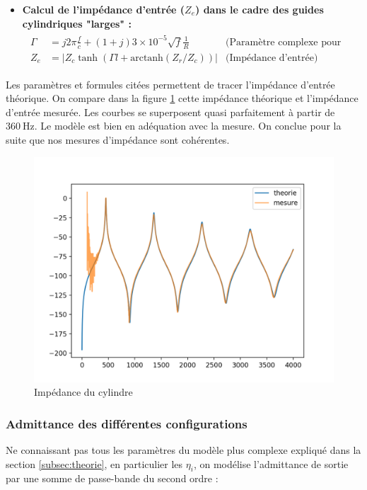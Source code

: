 \documentclass[atiam, article]{rapport} %
\begin{document}
\begin{itemize}
    \item \textbf{Calcul de l'impédance d'entrée (\(Z_e\)) dans le cadre des guides cylindriques "larges" :}
    \begin{align*}
        \begin{array}{lll}
            \Gamma & = j2\pi\frac{f}{c} + (1 + j)3 \times 10^{-5} \sqrt{f} \frac{1}{R} & \text{(Paramètre complexe pour les pertes viscothermiques)} \\
            Z_e & = \lvert Z_c \tanh(\Gamma l + \text{arctanh}(Z_r/Z_c)) \rvert & \text{(Impédance d'entrée)}
        \end{array}
        \label{eq:ze-cyl}
    \end{align*}
\end{itemize}

Les paramètres et formules citées permettent de tracer l'impédance d'entrée théorique. On compare dans la figure \ref{fig:ze-cyl} cette impédance théorique et l'impédance d'entrée mesurée. Les courbes se superposent quasi parfaitement à partir de $\SI{360}{\Hz}$. Le modèle est bien en adéquation avec la mesure. On conclue pour la suite que nos mesures d'impédance sont cohérentes.

\begin{figure}
    \centering
    \includegraphics[width=.7\textwidth]{vents/images_vents/impedance_cylindre.png}
    \caption{Impédance du cylindre}
    \label{fig:ze-cyl}
\end{figure}

\subsubsection{Admittance des différentes configurations}

Ne connaissant pas tous les paramètres du modèle plus complexe expliqué dans la section \ref{subsec:theorie}, en particulier les $\eta_i$, on modélise l'admittance de sortie par une somme de passe-bande du second ordre :
\end{document}
